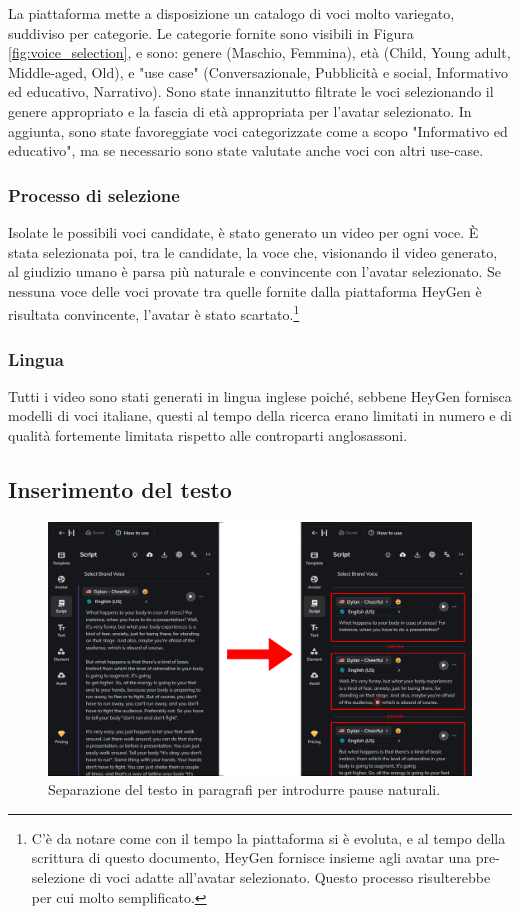 La piattaforma mette a disposizione un catalogo di voci molto variegato, suddiviso per categorie. Le categorie fornite sono visibili in Figura \ref{fig:voice_selection}, e sono: genere (Maschio, Femmina), età (Child, Young adult, Middle-aged, Old), e "use case" (Conversazionale, Pubblicità e social, Informativo ed educativo, Narrativo). Sono state innanzitutto filtrate le voci selezionando il genere appropriato e la fascia di età appropriata per l'avatar selezionato. In aggiunta, sono state favoreggiate voci categorizzate come a scopo "Informativo ed educativo", ma se necessario sono state valutate anche voci con altri use-case.

\subsubsection{Processo di selezione}

Isolate le possibili voci candidate, è stato generato un video per ogni voce. È stata selezionata poi, tra le candidate, la voce che, visionando il video generato, al giudizio umano è parsa più naturale e convincente con l'avatar selezionato. Se nessuna voce delle voci provate tra quelle fornite dalla piattaforma HeyGen è risultata convincente, l'avatar è stato scartato.\footnote{C'è da notare come con il tempo la piattaforma si è evoluta, e al tempo della scrittura di questo documento, HeyGen fornisce insieme agli avatar una pre-selezione di voci adatte all'avatar selezionato. Questo processo risulterebbe per cui molto semplificato.}

\subsubsection{Lingua} Tutti i video sono stati generati in lingua inglese poiché, sebbene HeyGen fornisca modelli di voci italiane, questi al tempo della ricerca erano limitati in numero e di qualità fortemente limitata rispetto alle controparti anglosassoni.

\subsection{Inserimento del testo}
\label{sec:text_editing}

\begin{figure}[t]
    \centering
    \includegraphics[width=0.9\linewidth]{images/text_heygen}
    \caption{Separazione del testo in paragrafi per introdurre pause naturali.}
    \label{fig:text_heygen}
\end{figure}


